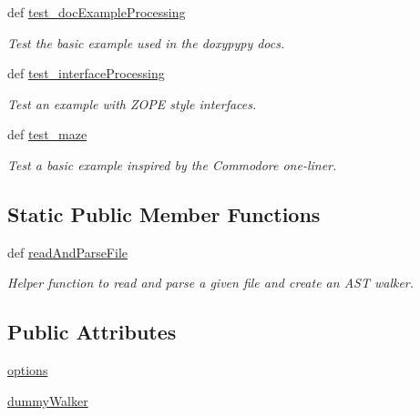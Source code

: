 \begin{DoxyCompactItemize}
def \hyperlink{classdoxypypy_1_1test_1_1test__doxypypy_1_1_test_doxypypy_aef5a4a5776289956d9df483ef918de61}{test\-\_\-doc\-Example\-Processing}
\begin{DoxyCompactList}\small\item\em Test the basic example used in the doxypypy docs. \end{DoxyCompactList}\item 
def \hyperlink{classdoxypypy_1_1test_1_1test__doxypypy_1_1_test_doxypypy_aab258e0b13ef27ab708d3ad5e4ca4a56}{test\-\_\-interface\-Processing}
\begin{DoxyCompactList}\small\item\em Test an example with Z\-O\-P\-E style interfaces. \end{DoxyCompactList}\item 
def \hyperlink{classdoxypypy_1_1test_1_1test__doxypypy_1_1_test_doxypypy_a60c30902034750726280ac3fc53effdb}{test\-\_\-maze}
\begin{DoxyCompactList}\small\item\em Test a basic example inspired by the Commodore one-\/liner. \end{DoxyCompactList}\end{DoxyCompactItemize}
\subsection*{Static Public Member Functions}
\begin{DoxyCompactItemize}
\item 
def \hyperlink{classdoxypypy_1_1test_1_1test__doxypypy_1_1_test_doxypypy_ad98a351311817444cb393f4b050e7ee8}{read\-And\-Parse\-File}
\begin{DoxyCompactList}\small\item\em Helper function to read and parse a given file and create an A\-S\-T walker. \end{DoxyCompactList}\end{DoxyCompactItemize}
\subsection*{Public Attributes}
\begin{DoxyCompactItemize}
\item 
\hyperlink{classdoxypypy_1_1test_1_1test__doxypypy_1_1_test_doxypypy_ad64196d23f8b36c556a4e02fb6de14e4}{options}
\item 
\hyperlink{classdoxypypy_1_1test_1_1test__doxypypy_1_1_test_doxypypy_af32c5af8e0092c6a7fb8353f7c88310d}{dummy\-Walker}
\end{DoxyCompactItemize}


